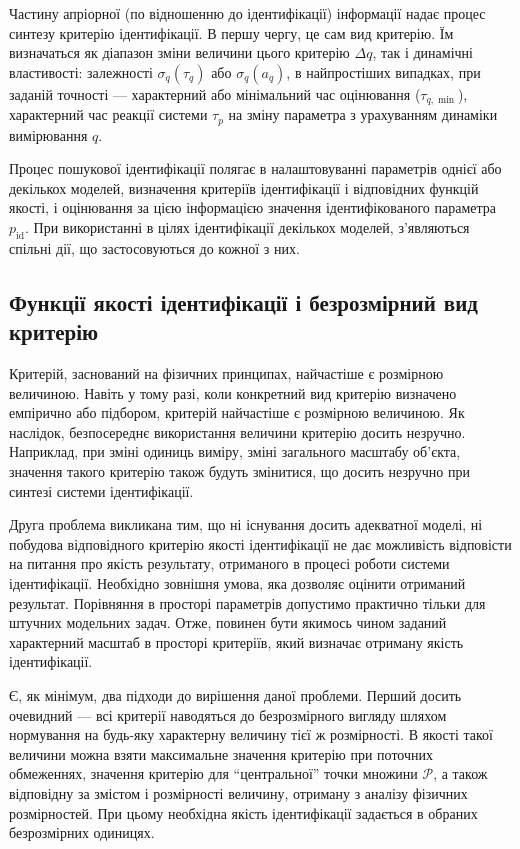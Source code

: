 Частину апріорної (по відношенню до ідентифікації) інформації
надає процес синтезу критерію ідентифікації. В першу чергу, це сам вид
критерію. Їм визначаться як діапазон зміни величини цього критерію
$\Delta q$\label{atu:d:Delta_q}, так і динамічні властивості: залежності
$\sigma_q (\tau_q)$ або $\sigma_q(a_q)$,
в найпростіших випадках, при заданій точності --- характерний або
мінімальний час оцінювання ($\tau_{q, \min}$),
характерний час реакції
системи $\tau_p$ на зміну параметра з урахуванням динаміки вимірювання $q$.

Процес пошукової ідентифікації полягає в налаштовуванні параметрів однієї або
декількох моделей, визначення критеріїв ідентифікації і відповідних функцій
якості, і оцінювання за цією інформацією значення ідентифікованого параметра
\label{atu:d:p_id}$p_\mathrm{id}$. При використанні в цілях
ідентифікації декількох моделей, з'являються спільні дії, що застосовуються до
кожної з них.




\subsection{Функції якості ідентифікації і безрозмірний вид критерію} %


Критерій, заснований на фізичних принципах, найчастіше є розмірною величиною.
Навіть у тому разі, коли конкретний вид критерію визначено емпірично або
підбором, критерій найчастіше є розмірною величиною.
Як наслідок, безпосереднє
використання величини критерію досить незручно. Наприклад, при зміні одиниць
виміру, зміні загального масштабу об'єкта, значення такого критерію також
будуть змінитися, що досить незручно при синтезі системи ідентифікації.

Друга проблема викликана тим, що ні існування досить
адекватної моделі, ні побудова відповідного критерію якості
ідентифікації не дає можливість відповісти на питання
про якість результату, отриманого в процесі роботи системи
ідентифікації. Необхідно зовнішня умова, яка дозволяє оцінити
отриманий результат. Порівняння в просторі параметрів допустимо
практично тільки для штучних модельних задач. Отже, повинен
бути якимось чином заданий характерний масштаб в просторі
критеріїв, який визначає отриману якість ідентифікації.

Є, як мінімум, два підходи до вирішення даної проблеми. Перший
досить очевидний --- всі критерії наводяться до безрозмірного
вигляду шляхом нормування на будь-яку характерну величину тієї ж
розмірності. В якості такої величини можна взяти максимальне
значення критерію при поточних обмеженнях, значення критерію
для ``центральної'' точки множини $\mathcal{P}$,
а також відповідну за змістом і розмірності величину,
отриману з аналізу фізичних розмірностей. При цьому необхідна
якість ідентифікації задається в обраних безрозмірних одиницях.

